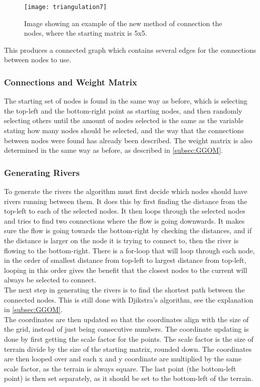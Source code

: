 \begin{figure}[H]
	\texttt{[image: triangulation7]}
	\centering
	\caption{Image showing an example of the new method of connection the nodes, where the starting matrix is 5x5.}
	\label{fig:triangulation7}
\end{figure}

	This produces a connected graph which contains several edges for the connections between nodes to use.\\

\subsubsection{Connections and Weight Matrix}
	The starting set of nodes is found in the same way as before, which is selecting the top-left and the bottom-right point as starting nodes, and then randomly selecting others until the amount of nodes selected is the same as the variable stating how many nodes should be selected, and the way that the connections between nodes were found has already been described.
	The weight matrix is also determined in the same way as before, as described in \ref{subsec:GGOM}.

\subsubsection{Generating Rivers}
	To generate the rivers the algorithm must first decide which nodes should have rivers running between them. It does this by first finding the distance from the top-left to each of the selected nodes. It then loops through the selected nodes and tries to find two connections where the flow is going downwards. It makes sure the flow is going towards the bottom-right by checking the distances, and if the distance is larger on the node it is trying to connect to, then the river is flowing to the bottom-right. There is a for-loop that will loop through each node, in the order of smallest distance from top-left to largest distance from top-left, looping in this order gives the benefit that the closest nodes to the current will always be selected to connect.\\


	The next step in generating the rivers is to find the shortest path between the connected nodes. This is still done with Djikstra's algorithm, see the explanation in \ref{subsec:GGOM}.\\
	The coordinates are then updated so that the coordinates align with the size of the grid, instead of just being consecutive numbers. The coordinate updating is done by first getting the scale factor for the points. The scale factor is the size of terrain divide by the size of the starting matrix, rounded down. The coordinates are then looped over and each x and y coordinate are multiplied by the same scale factor, as the terrain is always square. The last point (the bottom-left point) is then set separately, as it should be set to the bottom-left of the terrain. \\

